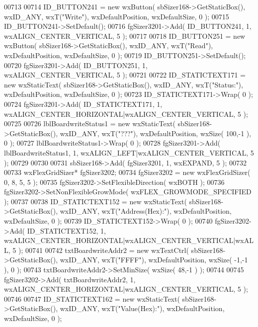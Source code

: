 \begin{DoxyCode}
00713     
00714     ID_BUTTON241 = \textcolor{keyword}{new} wxButton( sbSizer168->GetStaticBox(), wxID\_ANY, wxT(\textcolor{stringliteral}{"Write"}), wxDefaultPosition, 
      wxDefaultSize, 0 );
00715     ID_BUTTON241->SetDefault(); 
00716     fgSizer3201->Add( ID_BUTTON241, 1, wxALIGN\_CENTER\_VERTICAL, 5 );
00717     
00718     ID_BUTTON251 = \textcolor{keyword}{new} wxButton( sbSizer168->GetStaticBox(), wxID\_ANY, wxT(\textcolor{stringliteral}{"Read"}), wxDefaultPosition, 
      wxDefaultSize, 0 );
00719     ID_BUTTON251->SetDefault(); 
00720     fgSizer3201->Add( ID_BUTTON251, 1, wxALIGN\_CENTER\_VERTICAL, 5 );
00721     
00722     ID_STATICTEXT171 = \textcolor{keyword}{new} wxStaticText( sbSizer168->GetStaticBox(), wxID\_ANY, wxT(\textcolor{stringliteral}{"Status:"}), 
      wxDefaultPosition, wxDefaultSize, 0 );
00723     ID_STATICTEXT171->Wrap( 0 );
00724     fgSizer3201->Add( ID_STATICTEXT171, 1, wxALIGN\_CENTER\_HORIZONTAL|wxALIGN\_CENTER\_VERTICAL, 5 );
00725     
00726     lblBoardwriteStatus1 = \textcolor{keyword}{new} wxStaticText( sbSizer168->GetStaticBox(), wxID\_ANY, wxT(\textcolor{stringliteral}{"???"}), 
      wxDefaultPosition, wxSize( 100,-1 ), 0 );
00727     lblBoardwriteStatus1->Wrap( 0 );
00728     fgSizer3201->Add( lblBoardwriteStatus1, 1, wxALIGN\_LEFT|wxALIGN\_CENTER\_VERTICAL, 5 );
00729     
00730     
00731     sbSizer168->Add( fgSizer3201, 1, wxEXPAND, 5 );
00732     
00733     wxFlexGridSizer* fgSizer3202;
00734     fgSizer3202 = \textcolor{keyword}{new} wxFlexGridSizer( 0, 8, 5, 5 );
00735     fgSizer3202->SetFlexibleDirection( wxBOTH );
00736     fgSizer3202->SetNonFlexibleGrowMode( wxFLEX\_GROWMODE\_SPECIFIED );
00737     
00738     ID_STATICTEXT152 = \textcolor{keyword}{new} wxStaticText( sbSizer168->GetStaticBox(), wxID\_ANY, wxT(\textcolor{stringliteral}{"Address(Hex):"}), 
      wxDefaultPosition, wxDefaultSize, 0 );
00739     ID_STATICTEXT152->Wrap( 0 );
00740     fgSizer3202->Add( ID_STATICTEXT152, 1, wxALIGN\_CENTER\_HORIZONTAL|wxALIGN\_CENTER\_VERTICAL|wxALL, 5 );
00741     
00742     txtBoardwriteAddr2 = \textcolor{keyword}{new} wxTextCtrl( sbSizer168->GetStaticBox(), wxID\_ANY, wxT(\textcolor{stringliteral}{"FFFF"}), 
      wxDefaultPosition, wxSize( -1,-1 ), 0 );
00743     txtBoardwriteAddr2->SetMinSize( wxSize( 48,-1 ) );
00744     
00745     fgSizer3202->Add( txtBoardwriteAddr2, 1, wxALIGN\_CENTER\_HORIZONTAL|wxALIGN\_CENTER\_VERTICAL, 5 );
00746     
00747     ID_STATICTEXT162 = \textcolor{keyword}{new} wxStaticText( sbSizer168->GetStaticBox(), wxID\_ANY, wxT(\textcolor{stringliteral}{"Value(Hex):"}), 
      wxDefaultPosition, wxDefaultSize, 0 );

\end{DoxyCode}
